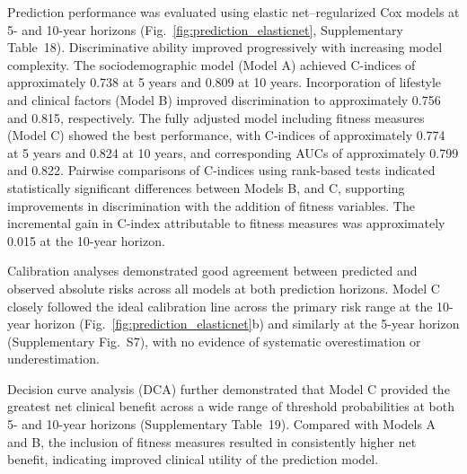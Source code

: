 \documentclass{article}
\begin{document}
Prediction performance was evaluated using elastic net--regularized Cox models at 5- and 10-year horizons (Fig.~\ref{fig:prediction_elasticnet}, Supplementary Table~18).
Discriminative ability improved progressively with increasing model complexity.
The sociodemographic model (Model A) achieved C-indices of approximately 0.738 at 5 years and 0.809 at 10 years.
Incorporation of lifestyle and clinical factors (Model B) improved discrimination to approximately 0.756 and 0.815, respectively.
The fully adjusted model including fitness measures (Model C) showed the best performance, with C-indices of approximately 0.774 at 5 years and 0.824 at 10 years, and corresponding AUCs of approximately 0.799 and 0.822.
Pairwise comparisons of C-indices using rank-based tests indicated statistically significant differences between Models B, and C, supporting improvements in discrimination with the addition of fitness variables.
The incremental gain in C-index attributable to fitness measures was approximately 0.015 at the 10-year horizon.


Calibration analyses demonstrated good agreement between predicted and observed absolute risks across all models at both prediction horizons.
Model C closely followed the ideal calibration line across the primary risk range at the 10-year horizon (Fig.~\ref{fig:prediction_elasticnet}b) and similarly at the 5-year horizon (Supplementary Fig.~S7), with no evidence of systematic overestimation or underestimation.


Decision curve analysis (DCA) further demonstrated that Model C provided the greatest net clinical benefit across a wide range of threshold probabilities at both 5- and 10-year horizons (Supplementary Table~19).
Compared with Models A and B, the inclusion of fitness measures resulted in consistently higher net benefit, indicating improved clinical utility of the prediction model.
\end{document}
